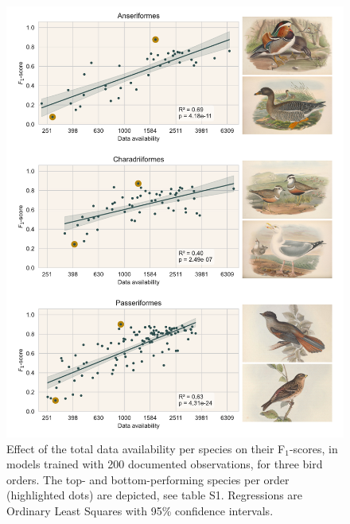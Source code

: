 \documentclass{article}
\begin{document}
\begin{figure}[!ht]
  \includegraphics[width=\textwidth]{1}
  \caption{\footnotesize
    Effect of the total data availability per species on their F$_1$-scores, in models trained with 200 documented observations, for three bird orders. The top- and bottom-performing species per order (highlighted dots) are depicted, see table S1. Regressions are Ordinary Least Squares with 95\% confidence intervals.}
  \label{fig:birds}
\end{figure}
\end{document}

